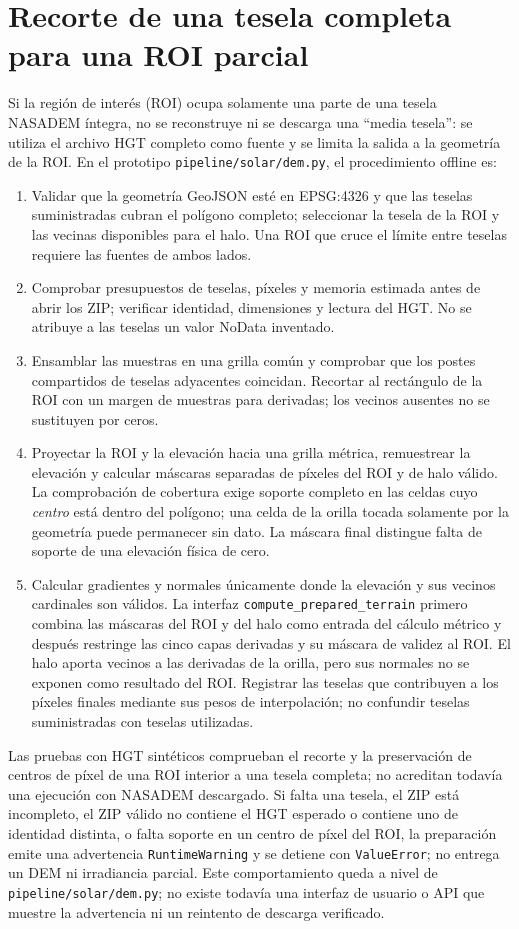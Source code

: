 \documentclass[11pt,a4paper]{article}
\begin{document}
\section{Recorte de una tesela completa para una ROI parcial}
Si la región de interés (ROI) ocupa solamente una parte de una tesela NASADEM íntegra, no se reconstruye ni se descarga una ``media tesela'': se utiliza el archivo HGT completo como fuente y se limita la salida a la geometría de la ROI. En el prototipo 
\texttt{pipeline/solar/dem.py}, el procedimiento offline es:
\begin{enumerate}
  \item Validar que la geometría GeoJSON esté en EPSG:4326 y que las teselas suministradas cubran el polígono completo; seleccionar la tesela de la ROI y las vecinas disponibles para el halo. Una ROI que cruce el límite entre teselas requiere las fuentes de ambos lados.
  \item Comprobar presupuestos de teselas, píxeles y memoria estimada antes de abrir los ZIP; verificar identidad, dimensiones y lectura del HGT. No se atribuye a las teselas un valor NoData inventado.
  \item Ensamblar las muestras en una grilla común y comprobar que los postes compartidos de teselas adyacentes coincidan. Recortar al rectángulo de la ROI con un margen de muestras para derivadas; los vecinos ausentes no se sustituyen por ceros.
  \item Proyectar la ROI y la elevación hacia una grilla métrica, remuestrear la elevación y calcular máscaras separadas de píxeles del ROI y de halo válido. La comprobación de cobertura exige soporte completo en las celdas cuyo \emph{centro} está dentro del polígono; una celda de la orilla tocada solamente por la geometría puede permanecer sin dato. La máscara final distingue falta de soporte de una elevación física de cero.
  \item Calcular gradientes y normales únicamente donde la elevación y sus vecinos cardinales son válidos. La interfaz \texttt{compute\_prepared\_terrain} primero combina las máscaras del ROI y del halo como entrada del cálculo métrico y después restringe las cinco capas derivadas y su máscara de validez al ROI. El halo aporta vecinos a las derivadas de la orilla, pero sus normales no se exponen como resultado del ROI. Registrar las teselas que contribuyen a los píxeles finales mediante sus pesos de interpolación; no confundir teselas suministradas con teselas utilizadas.
\end{enumerate}
Las pruebas con HGT sintéticos comprueban el recorte y la preservación de centros de píxel de una ROI interior a una tesela completa; no acreditan todavía una ejecución con NASADEM descargado. Si falta una tesela, el ZIP está incompleto, el ZIP válido no contiene el HGT esperado o contiene uno de identidad distinta, o falta soporte en un centro de píxel del ROI, la preparación emite una advertencia \texttt{RuntimeWarning} y se detiene con \texttt{ValueError}; no entrega un DEM ni irradiancia parcial. Este comportamiento queda a nivel de \texttt{pipeline/solar/dem.py}; no existe todavía una interfaz de usuario o API que muestre la advertencia ni un reintento de descarga verificado.
\end{document}
